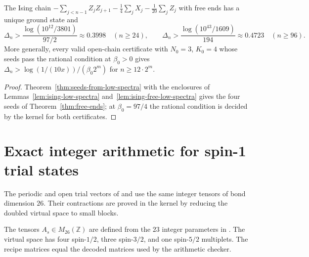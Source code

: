 \begin{theorem}
  \label{thm:ising-free-gap}
  \leanok
  The Ising chain \(-\sum_{j<n-1} Z_j Z_{j+1} - \tfrac14 \sum_j X_j - \tfrac1{20} \sum_j Z_j\)
  with free ends has a unique ground state and
  \[
    \Delta_n > \frac{\log(10^{12}/3801)}{97/2} \approx 0.3998 \quad (n \ge 24), \qquad
    \Delta_n > \frac{\log(10^{43}/1609)}{194} \approx 0.4723 \quad (n \ge 96).
  \]
  More generally, every valid open-chain certificate with \(N_0 = 3\), \(K_0 = 4\) whose seeds
  pass the rational condition at \(\beta_0 > 0\) gives
  \(\Delta_n > \log(1/(10x))/(\beta_0 2^m)\) for \(n \ge 12 \cdot 2^m\).
\end{theorem}
\begin{proof}
  \leanok
  Theorem~\ref{thm:seeds-from-low-spectra} with the enclosures of
  Lemmas~\ref{lem:ising-low-spectra} and~\ref{lem:ising-free-low-spectra} gives the four seeds of
  Theorem~\ref{thm:free-ends}; at \(\beta_0 = 97/4\) the rational condition is decided by the
  kernel for both certificates.
\end{proof}

\section{Exact integer arithmetic for spin-1 trial states}

The periodic and open trial vectors of \cite[Appendix C]{OpenAIHaldane} and
\cite[Appendix B]{OpenAIBoundary} use the same integer tensors of bond dimension \(26\).
Their contractions are proved in the kernel by reducing the doubled virtual space to small blocks.

\begin{definition}
  \label{def:kernel-spin1-trial}
  \leanok
  The tensors \(A_s\in M_{26}(\mathbb Z)\) are defined from the \(23\) integer parameters
  in \cite[Appendix C.2]{OpenAIHaldane}.
  The virtual space has four spin-\(1/2\), three spin-\(3/2\), and one spin-\(5/2\) multiplets.
  The recipe matrices equal the decoded matrices used by the arithmetic checker.
\end{definition}

